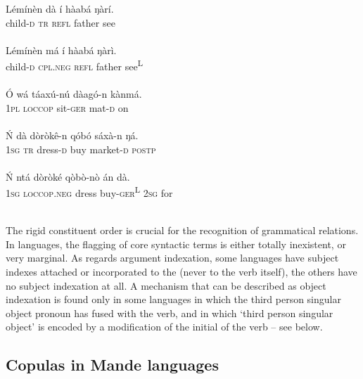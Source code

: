 \documentclass[output=paper]{langsci/langscibook}
\begin{document}
   \ex
    \gll   Lémínèn  dà  í  hàabá  ŋàrí.\\
      child-\textsc{d}  \textsc{tr}  \textsc{refl}  father  see\\
      \\

   \ex
    \gll   Lémínèn  má  í  hàabá  ŋàrì.\\
      child-\textsc{d}  \textsc{cpl.neg}  \textsc{refl}  father  see\textsuperscript{\tiny L}\\
      \\

   \ex
    \gll   Ó  wá  táaxú-nú  dàagó-n  kànmá.\\
      \textsc{1pl}  \textsc{loccop}  sit-\textsc{ger}  mat-\textsc{d}  on\\
      \\

   \ex
    \gll   \'N  dà  dòròkê-n  qóbó  sáxà-n  ŋá. \\
      \textsc{1sg}  \textsc{tr}  dress-\textsc{d}  buy  market-\textsc{d}   \textsc{postp}\\
      \\

   \ex
    \gll   \'N  ntá  dòròké  qòbò-nò  án  dà. \\
      \textsc{1sg}  \textsc{loccop.neg}  dress  buy-\textsc{ger}\textsuperscript{\tiny L}  \textsc{2sg}  for\\
      \\


\z
\z


The rigid constituent order is crucial for the recognition of grammatical relations. In  languages, the flagging of core syntactic terms is either totally inexistent, or very marginal. As regards argument indexation, some  languages have subject indexes attached or incorporated to the  (never to the verb itself), the others have no subject indexation at all. A mechanism that can be described as object indexation is found only in some languages in which the third person singular object pronoun has fused with the verb, and in which ‘third person singular object’ is encoded by a modification of the initial of the verb – see  below.

\subsection{Copulas in Mande languages}\label{sec:creissels:3.3}
\end{document}
